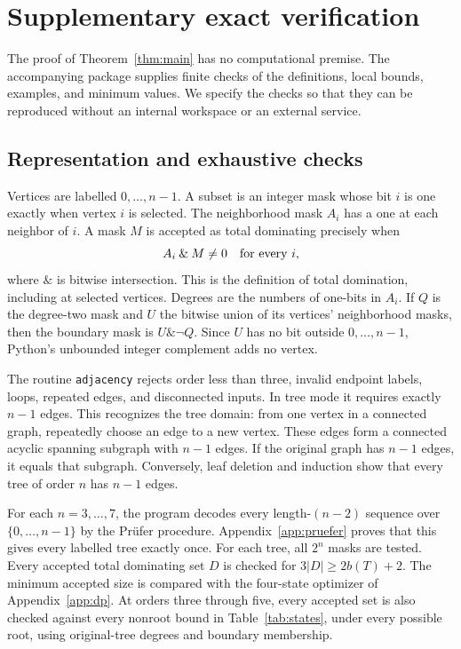\documentclass[11pt,a4paper]{article}
\theoremstyle{remark}
\begin{document}
\section{Supplementary exact verification}
\label{sec:verification}

The proof of Theorem~\ref{thm:main} has no computational premise.
The accompanying package supplies finite checks of the definitions,
local bounds, examples, and minimum values. We specify the checks
so that they can be reproduced without an internal workspace or
an external service.

\subsection{Representation and exhaustive checks}

Vertices are labelled $0,\ldots,n-1$. A subset is an integer mask
whose bit $i$ is one exactly when vertex $i$ is selected.
The neighborhood mask $A_i$ has a one at each neighbor of $i$.
A mask $M$ is accepted as total dominating precisely when
\begin{equation}\label{eq:masktd}
 A_i\mathbin{\&}M\ne 0\quad\hbox{for every }i,
\end{equation}
where $\&$ is bitwise intersection. This is the definition of total
domination, including at selected vertices. Degrees are the numbers
of one-bits in $A_i$. If $Q$ is the degree-two mask and $U$ the
bitwise union of its vertices' neighborhood masks, then the boundary
mask is $U\mathbin{\&}\neg Q$. Since $U$ has no bit outside
$0,\ldots,n-1$, Python's unbounded integer complement adds no vertex.

The routine \texttt{adjacency} rejects order less than three,
invalid endpoint labels, loops, repeated edges, and disconnected
inputs. In tree mode it requires exactly $n-1$ edges.
This recognizes the tree domain: from one vertex in a connected
graph, repeatedly choose an edge to a new vertex. These edges form
a connected acyclic spanning subgraph with $n-1$ edges. If the
original graph has $n-1$ edges, it equals that subgraph.
Conversely, leaf deletion and induction show that every tree of
order $n$ has $n-1$ edges.

For each $n=3,\ldots,7$, the program decodes every length-$(n-2)$
sequence over $\{0,\ldots,n-1\}$ by the Pr\"ufer procedure.
Appendix~\ref{app:pruefer} proves that this gives every labelled tree
exactly once. For each tree, all $2^n$ masks are tested. Every accepted
total dominating set $D$ is checked for $3|D|\ge 2b(T)+2$.
The minimum accepted size is compared with the four-state optimizer
of Appendix~\ref{app:dp}. At orders three through five, every accepted
set is also checked against every nonroot bound in
Table~\ref{tab:states}, under every possible root, using original-tree
degrees and boundary membership.
\end{document}
